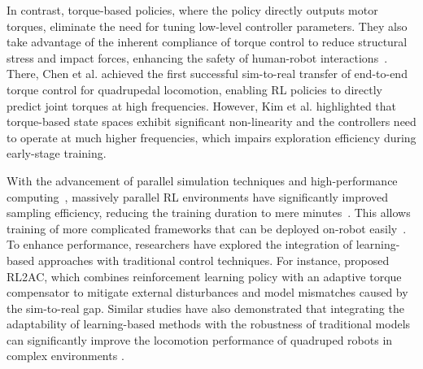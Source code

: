 In contrast, torque-based policies, where the policy directly outputs motor torques, eliminate the need for tuning low-level controller parameters.
They also take advantage of the inherent compliance of torque control to reduce structural stress and impact forces, enhancing the safety of human-robot interactions~\cite{calanca2015review}.
There, Chen et al.\cite{chen2023learning} achieved the first successful sim-to-real transfer of end-to-end torque control for quadrupedal locomotion, enabling RL policies to directly predict joint torques at high frequencies.
However, Kim et al.\cite{kim2023torque} highlighted that torque-based state spaces exhibit significant non-linearity and the controllers need to operate at much higher frequencies, which impairs exploration efficiency during early-stage training.

With the advancement of parallel simulation techniques and high-performance computing~\cite{makoviychuk2021isaac, rudin2022learning}, massively parallel RL environments have significantly improved sampling efficiency, reducing the training duration to mere minutes~\cite{rudin2022learningwalkminutesusing}.
This allows training of more complicated frameworks that can be deployed on-robot easily~\cite{zuo2024learning, chen2024learning, kumar2021rma}.
To enhance performance, researchers have explored the integration of learning-based approaches with traditional control techniques. For instance, \citet{gangapurwala2022rloc} proposed RL2AC, which combines reinforcement learning policy with an adaptive torque compensator to mitigate external disturbances and model mismatches caused by the sim-to-real gap.
Similar studies have also demonstrated that integrating the adaptability of learning-based methods with the robustness of traditional models can significantly improve the locomotion performance of quadruped robots in complex environments \cite{yao2021hierarchical, zhang2022learning, zhang2022model}.

